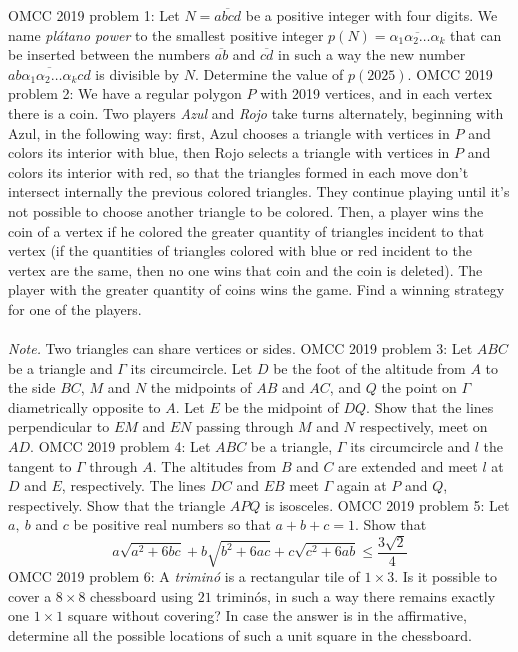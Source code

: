 OMCC 2019 problem 1:  Let $N=\overline{abcd}$ be a positive integer with four digits. We name \textit{plátano power} to the smallest positive integer $p(N)=\overline{\alpha_1\alpha_2\ldots\alpha_k}$ that can be inserted between  the numbers $\overline{ab}$ and $\overline{cd}$ in such a way the new number $\overline{ab\alpha_1\alpha_2\ldots\alpha_kcd}$ is divisible by $N$. Determine the value of $p(2025)$. 
OMCC 2019 problem 2:  We have a regular polygon $P$ with 2019 vertices, and in each vertex there is a coin. Two players \textit{Azul} and \textit{Rojo} take turns alternately, beginning with Azul, in the following way: first, Azul chooses a triangle with vertices in $P$ and colors its interior with blue, then Rojo selects a triangle with vertices in $P$ and colors its interior with red, so that the triangles formed in each move don't intersect internally the previous colored triangles. They continue playing until it's not possible to choose another triangle to be colored. Then, a player wins the coin of a vertex if he colored the greater quantity of triangles incident to that vertex (if the quantities of triangles colored with blue or red incident to the vertex are the same, then no one wins that coin and the coin is deleted). The player with the greater quantity of coins wins the game.  Find a winning strategy for one of the players. \\\\
\textit{Note.} Two triangles can share vertices or sides. 
OMCC 2019 problem 3:  Let $ABC$ be a triangle and $\Gamma$ its circumcircle. Let $D$ be the foot of the altitude from $A$ to the side $BC$, $M$ and $N$ the midpoints of $AB$ and $AC$, and $Q$ the point on $\Gamma$ diametrically opposite to $A$. Let $E$ be the midpoint of $DQ$. Show that the lines perpendicular to $EM$ and $EN$ passing through $M$ and $N$ respectively, meet on $AD$. 
OMCC 2019 problem 4:  Let $ABC$ be a triangle, $\Gamma$ its circumcircle and $l$ the tangent to $\Gamma$ through $A$. The altitudes from $B$ and $C$ are extended and meet $l$ at $D$ and $E$, respectively. The lines $DC$ and $EB$ meet $\Gamma$ again at $P$ and $Q$, respectively. Show that the triangle $APQ$ is isosceles. 
OMCC 2019 problem 5:  Let $a,\ b$ and $c$ be positive real numbers so that $a+b+c=1$. Show that
\[ a\sqrt{a^2+6bc}+b\sqrt{b^2+6ac}+c\sqrt{c^2+6ab}\leq\frac{3\sqrt{2}}{4} \] 
OMCC 2019 problem 6:  A \textit{triminó} is a rectangular tile of $1\times 3$. Is it possible to cover a $8\times8$ chessboard using $21$ triminós, in such a way there remains exactly one $1\times 1$ square without covering? In case the answer is in the affirmative, determine all the possible locations of such a unit square in the chessboard. 

